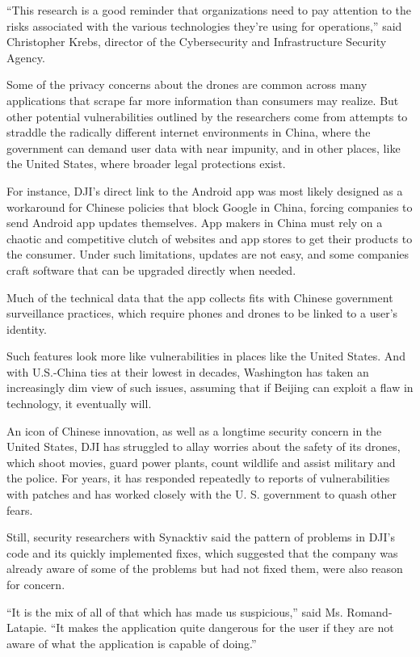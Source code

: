 ``This research is a good reminder that organizations need to pay
attention to the risks associated with the various technologies they're
using for operations,'' said Christopher Krebs, director of the
Cybersecurity and Infrastructure Security Agency.

Some of the privacy concerns about the drones are common across many
applications that scrape far more information than consumers may
realize. But other potential vulnerabilities outlined by the researchers
come from attempts to straddle the radically different internet
environments in China, where the government can demand user data with
near impunity, and in other places, like the United States, where
broader legal protections exist.

For instance, DJI's direct link to the Android app was most likely
designed as a workaround for Chinese policies that block Google in
China, forcing companies to send Android app updates themselves. App
makers in China must rely on a chaotic and competitive clutch of
websites and app stores to get their products to the consumer. Under
such limitations, updates are not easy, and some companies craft
software that can be upgraded directly when needed.

Much of the technical data that the app collects fits with Chinese
government surveillance practices, which require phones and drones to be
linked to a user's identity.

Such features look more like vulnerabilities in places like the United
States. And with U.S.-China ties at their lowest in decades, Washington
has taken an increasingly dim view of such issues, assuming that if
Beijing can exploit a flaw in technology, it eventually will.

An icon of Chinese innovation, as well as a longtime security concern in
the United States, DJI has struggled to allay worries about the safety
of its drones, which shoot movies, guard power plants, count wildlife
and assist military and the police. For years, it has responded
repeatedly to reports of vulnerabilities with patches and has worked
closely with the U. S. government to quash other fears.

Still, security researchers with Synacktiv said the pattern of problems
in DJI's code and its quickly implemented fixes, which suggested that
the company was already aware of some of the problems but had not fixed
them, were also reason for concern.

``It is the mix of all of that which has made us suspicious,'' said Ms.
Romand-Latapie. ``It makes the application quite dangerous for the user
if they are not aware of what the application is capable of doing.''

